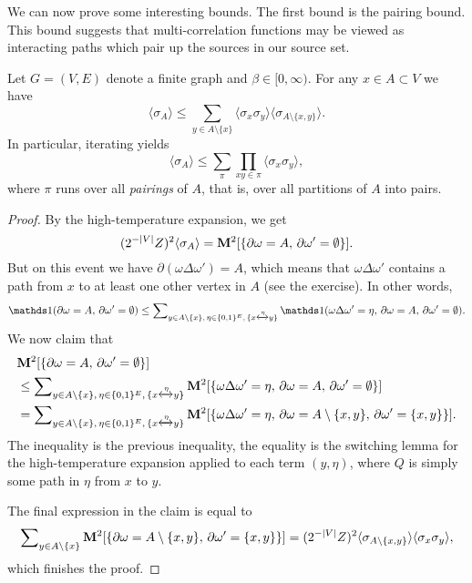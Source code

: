 We can now prove some interesting bounds.
The first bound is the pairing bound.
This bound suggests that multi-correlation functions may be viewed
as interacting paths which pair up the sources in our source set.

\begin{theorem}
    \label{thm:pairing}
    Let $G=(V,E)$ denote a finite graph and $\beta\in[0,\infty)$.
    For any $x\in A\subset V$ we have
    \begin{equation}
        \langle\sigma_A\rangle
        \leq
        \sum_{y\in A\setminus\{x\}}
        \langle\sigma_x\sigma_y\rangle
        \langle \sigma_{A\setminus\{x,y\}}\rangle.
    \end{equation}
    In particular, iterating yields
    \[
        \langle\sigma_A\rangle
        \leq
        \sum_{\pi}
        \prod_{xy\in\pi}
        \langle\sigma_x\sigma_y\rangle,
    \]
    where $\pi$ runs over all \emph{pairings} of $A$,
    that is, over all partitions of $A$ into pairs.
\end{theorem}

\begin{proof}
    By the high-temperature expansion,
    we get
    \[
        (2^{-|V|}Z)^2 \langle\sigma_A\rangle
        =
        \mathbf{M}^2[\{\partial\omega = A,\,\partial\omega'=\emptyset\}].
    \]
    But on this event we have $\partial(\omega\Delta\omega')=A$,
    which means that $\omega\Delta\omega'$ contains a path
    from $x$ to at least one other vertex in $A$ (see the exercise).
    In other words,
    \[
        \true{\partial\omega = A,\,\partial\omega'=\emptyset}
        \leq
        \sum\nolimits_{y\in A\setminus\{x\},\,\eta\in\{0,1\}^E,\,\{x\xleftrightarrow{\eta}y\}}
        \true{\omega\Delta\omega'=\eta,\,\partial\omega = A,\,\partial\omega'=\emptyset}.
    \]
    We now claim that
    \begin{align}
        &\mathbf{M}^2[\{\partial\omega = A,\,\partial\omega'=\emptyset\}]
        \\&\leq 
            \sum\nolimits_{y\in A\setminus\{x\},\,\eta\in\{0,1\}^E,\,\{x\xleftrightarrow{\eta}y\}}
        \mathbf{M}^2[
        \{\omega\Delta\omega'=\eta,\,\partial\omega = A,\,\partial\omega'=\emptyset\}
        ]
        \\&=
            \sum\nolimits_{y\in A\setminus\{x\},\,\eta\in\{0,1\}^E,\,\{x\xleftrightarrow{\eta}y\}}
        \mathbf{M}^2[
        \{\omega\Delta\omega'=\eta,\,\partial\omega = A\setminus\{x,y\},\,\partial\omega'=\{x,y\}\}
        ].
    \end{align}
    The inequality is the previous inequality,
    the equality is the switching lemma for the high-temperature expansion
    applied to each term $(y,\eta)$,
    where $Q$ is simply some path in $\eta$ from $x$ to $y$.

    The final expression in the claim is equal to
    \[
        \sum\nolimits_{y\in A\setminus\{x\}}
        \mathbf{M}^2[
        \{\partial\omega = A\setminus\{x,y\},\,\partial\omega'=\{x,y\}\}
        ]
        =
        (2^{-|V|}Z)^2 \langle\sigma_{A\setminus\{x,y\}}\rangle\langle\sigma_x\sigma_y\rangle,
    \]
    which finishes the proof.
\end{proof}

